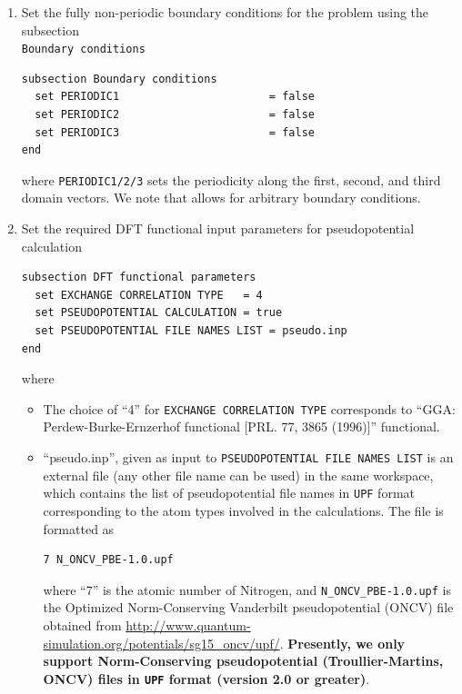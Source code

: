 \begin{enumerate}
\begin{itemize}
{\bf We require Cartesian coordinates for fully non-periodic simulation domain like above while fractional coordinates
are mandatory for periodic and semi-periodic simulation domain.}
\end{itemize}

\item Set the fully non-periodic boundary conditions for the problem using the subsection\\ \verb|Boundary conditions|
\begin{verbatim}	
subsection Boundary conditions
  set PERIODIC1                       = false
  set PERIODIC2                       = false
  set PERIODIC3                       = false
end
\end{verbatim}
where \verb|PERIODIC1/2/3| sets the periodicity along the first, second, and third domain vectors.
We note that \dftfe{} allows for arbitrary boundary conditions.

\item
Set the required DFT functional input parameters for pseudopotential calculation 	
\begin{verbatim}
subsection DFT functional parameters
  set EXCHANGE CORRELATION TYPE   = 4
  set PSEUDOPOTENTIAL CALCULATION = true
  set PSEUDOPOTENTIAL FILE NAMES LIST = pseudo.inp
end
\end{verbatim}
where
\begin{itemize}		
\item The choice of ``4'' for \verb|EXCHANGE CORRELATION TYPE| corresponds to ``GGA: Perdew-Burke-Ernzerhof
functional [PRL. 77, 3865 (1996)]'' functional. 
		
\item ``pseudo.inp'', given as input to \verb|PSEUDOPOTENTIAL FILE NAMES LIST| is an external file (any other file name can be used) in the same workspace, which contains the list of pseudopotential file names in \verb|UPF| format corresponding to the atom types involved in the calculations. The file is formatted as 
\begin{verbatim}
7 N_ONCV_PBE-1.0.upf
\end{verbatim}
		where ``7'' is the atomic number of Nitrogen, and \verb|N_ONCV_PBE-1.0.upf| is the Optimized Norm-Conserving Vanderbilt pseudopotential (ONCV) file obtained from \url{http://www.quantum-simulation.org/potentials/sg15\_oncv/upf/}. {\bf Presently, we only support Norm-Conserving pseudopotential (Troullier-Martins, ONCV) files in \verb|UPF| format (version 2.0 or greater)}.
\end{itemize}


\end{enumerate}

